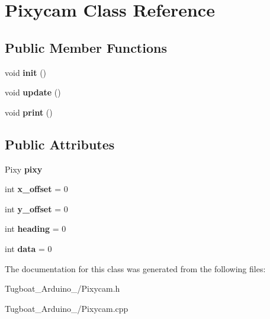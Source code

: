 \hypertarget{class_pixycam}{}\section{Pixycam Class Reference}
\label{class_pixycam}
\subsection*{Public Member Functions}
\begin{DoxyCompactItemize}
\item 
void {\bfseries init} ()\hypertarget{class_pixycam_a49da1e59eda420e02062cdd2faae457f}{}\label{class_pixycam_a49da1e59eda420e02062cdd2faae457f}

\item 
void {\bfseries update} ()\hypertarget{class_pixycam_adab9bbd0ec2d9a1171805ccac22ee858}{}\label{class_pixycam_adab9bbd0ec2d9a1171805ccac22ee858}

\item 
void {\bfseries print} ()\hypertarget{class_pixycam_a0de4d34b57257c283fe8350f16fa29b3}{}\label{class_pixycam_a0de4d34b57257c283fe8350f16fa29b3}

\end{DoxyCompactItemize}
\subsection*{Public Attributes}
\begin{DoxyCompactItemize}
\item 
Pixy {\bfseries pixy}\hypertarget{class_pixycam_aff7edc67f54c08390c786eb83186c962}{}\label{class_pixycam_aff7edc67f54c08390c786eb83186c962}

\item 
int {\bfseries x\+\_\+offset} = 0\hypertarget{class_pixycam_a079fccb432e32c49f85223069b9143b2}{}\label{class_pixycam_a079fccb432e32c49f85223069b9143b2}

\item 
int {\bfseries y\+\_\+offset} = 0\hypertarget{class_pixycam_a78db4ec4f2a2561c003868d37e1dc561}{}\label{class_pixycam_a78db4ec4f2a2561c003868d37e1dc561}

\item 
int {\bfseries heading} = 0\hypertarget{class_pixycam_aac007f3ff2cd4aa36c1c7fb036ac2449}{}\label{class_pixycam_aac007f3ff2cd4aa36c1c7fb036ac2449}

\item 
int {\bfseries data} = 0\hypertarget{class_pixycam_a0711c3ce000b0e99a19c4e827229c9f6}{}\label{class_pixycam_a0711c3ce000b0e99a19c4e827229c9f6}

\end{DoxyCompactItemize}


The documentation for this class was generated from the following files\+:\begin{DoxyCompactItemize}
\item 
Tugboat\+\_\+\+Arduino\+\_/Pixycam.\+h\item 
Tugboat\+\_\+\+Arduino\+\_/Pixycam.\+cpp\end{DoxyCompactItemize}
